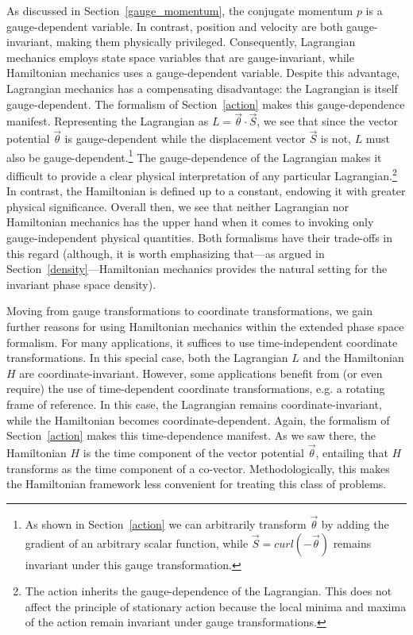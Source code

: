 \documentclass[12pt, english, twoside]{article} %
\renewcommand{\vector}[1]{\ensuremath{\vec{#1}}} %
\begin{document}
As discussed in Section~\ref{gauge_momentum}, the conjugate momentum $p$ is a gauge-dependent variable. In contrast, position and velocity are both gauge-invariant, making them physically privileged. Consequently, Lagrangian mechanics employs state space variables that are gauge-invariant, while Hamiltonian mechanics uses a gauge-dependent variable. Despite this advantage, Lagrangian mechanics has a compensating disadvantage: the Lagrangian is itself gauge-dependent. The formalism of Section~\ref{action} makes this gauge-dependence manifest. Representing the Lagrangian as $L =\vector{\theta} \cdot \vector{S} $, we see that since the vector potential $\vector{\theta}$ is gauge-dependent while the displacement vector $\vector{S}$ is not, $L$ must also be gauge-dependent.\footnote{As shown in Section~\ref{action} we can arbitrarily transform $\vector{\theta}$ by adding the gradient of an arbitrary scalar function, while $\vector{S}=curl(-\vector{\theta}) $ remains invariant under this gauge transformation.} The gauge-dependence of the Lagrangian makes it difficult to provide a clear physical interpretation of any particular Lagrangian.\footnote{The action inherits the gauge-dependence of the Lagrangian. This does not affect the principle of stationary action because the local minima and maxima of the action remain invariant under gauge transformations.} In contrast, the Hamiltonian is defined up to a constant, endowing it with greater physical significance. Overall then, we see that neither Lagrangian nor Hamiltonian mechanics has the upper hand when it comes to invoking only gauge-independent physical quantities. Both formalisms have their trade-offs in this regard (although, it is worth emphasizing that---as argued in Section~\ref{density}---Hamiltonian mechanics provides the natural setting for the invariant phase space density).

Moving from gauge transformations to coordinate transformations, we gain further reasons for using Hamiltonian mechanics within the extended phase space formalism. For many applications, it suffices to use time-independent coordinate transformations. In this special case, both the Lagrangian $L$ and the Hamiltonian $H$ are coordinate-invariant. However, some applications benefit from (or even require) the use of time-dependent coordinate transformations, e.g. a rotating frame of reference. In this case, the Lagrangian remains coordinate-invariant, while the Hamiltonian becomes coordinate-dependent. Again, the formalism of Section~\ref{action} makes this time-dependence manifest. As we saw there, the Hamiltonian $H$ is the time component of the vector potential $\vector{\theta} $, entailing that $H$ transforms as the time component of a co-vector. Methodologically, this makes the Hamiltonian framework less convenient for treating this class of problems.
\end{document}
